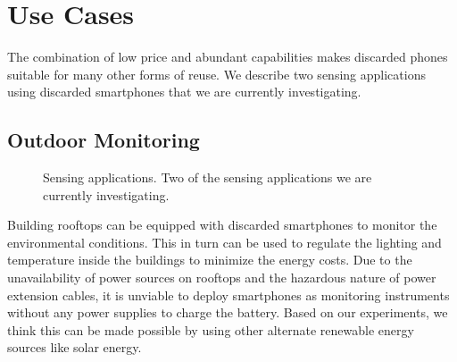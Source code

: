 \section{Use Cases}
\label{sec-usecases}
The combination of low price and abundant capabilities makes discarded phones
suitable for many other forms of reuse. 
We describe two sensing applications using discarded smartphones that we are
currently investigating.
\subsection{Outdoor Monitoring}
\label{sec-rooftop}
\begin{figure}[t]
  \centering
  \quad


  \vspace*{-0.1in}

  \caption{\small Sensing applications.
  \textnormal{Two of the sensing applications we are currently investigating.}}

  \vspace*{-0.1in}

\end{figure}
Building rooftops can be equipped with discarded smartphones to monitor the
environmental conditions. This in turn can be used to regulate the lighting and
temperature inside the buildings to minimize the energy costs.
Due to the unavailability of power sources on rooftops and the hazardous nature of
power extension cables, it is unviable to deploy smartphones as monitoring
instruments without any power supplies to charge the battery.
Based on our experiments, we think this can be made possible by using other
alternate renewable energy sources like solar energy.

